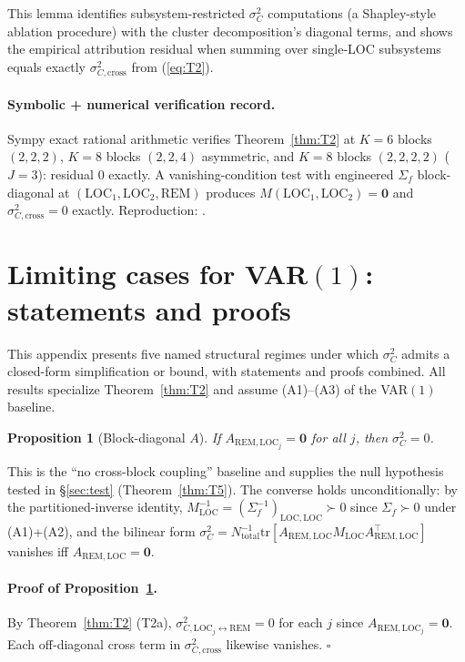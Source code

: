 \documentclass[11pt,letterpaper]{article}
\newtheorem{proposition}{Proposition}
\theoremstyle{remark}
\newcommand{\REM}{\mathrm{REM}}
\newcommand{\LOC}{\mathrm{LOC}}
\newcommand{\Sigmaf}{\Sigma_f}
\newcommand{\Mloc}{M_{\LOC}}
\newcommand{\Ntot}{N_{\mathrm{total}}}
\newcommand{\sigC}{\sigma^2_C}
\newcommand{\trace}{\mathrm{tr}}
\begin{document}
This lemma identifies subsystem-restricted $\sigC$ computations (a Shapley-style ablation procedure) with the cluster decomposition's diagonal terms, and shows the empirical attribution residual when summing over single-LOC subsystems equals exactly $\sigma^2_{C, \mathrm{cross}}$ from (\ref{eq:T2}).

\paragraph{Symbolic + numerical verification record.} Sympy exact rational arithmetic verifies Theorem~\ref{thm:T2} at $K = 6$ blocks $(2, 2, 2)$, $K = 8$ blocks $(2, 2, 4)$ asymmetric, and $K = 8$ blocks $(2, 2, 2, 2)$ ($J = 3$): residual $0$ exactly. A vanishing-condition test with engineered $\Sigmaf$ block-diagonal at $(\LOC_1, \LOC_2, \REM)$ produces $M(\LOC_1, \LOC_2) = \mathbf{0}$ and $\sigma^2_{C, \mathrm{cross}} = 0$ exactly. Reproduction: .

\section{Limiting cases for VAR$(1)$: statements and proofs}\label{app:C}

This appendix presents five named structural regimes under which $\sigma^2_C$ admits a closed-form simplification or bound, with statements and proofs combined. All results specialize Theorem~\ref{thm:T2} and assume (A1)--(A3) of the VAR$(1)$ baseline.

\begin{proposition}[Block-diagonal $A$]\label{prop:P1}
If $A_{\REM, \LOC_j} = \mathbf{0}$ for all $j$, then $\sigma^2_C = 0$.
\end{proposition}

This is the ``no cross-block coupling'' baseline and supplies the null hypothesis tested in \S\ref{sec:test} (Theorem~\ref{thm:T5}). The converse holds unconditionally: by the partitioned-inverse identity, $\Mloc^{-1} = (\Sigmaf^{-1})_{\LOC, \LOC} \succ 0$ since $\Sigmaf \succ 0$ under (A1)+(A2), and the bilinear form $\sigC = \Ntot^{-1} \trace[A_{\REM, \LOC} \Mloc A_{\REM, \LOC}^\top]$ vanishes iff $A_{\REM, \LOC} = \mathbf{0}$.

\paragraph{Proof of Proposition~\ref{prop:P1}.} By Theorem~\ref{thm:T2} (T2a), $\sigma^2_{C, \LOC_j \leftrightarrow \REM} = 0$ for each $j$ since $A_{\REM, \LOC_j} = \mathbf{0}$. Each off-diagonal cross term in $\sigma^2_{C, \mathrm{cross}}$ likewise vanishes. $\square$
\end{document}
